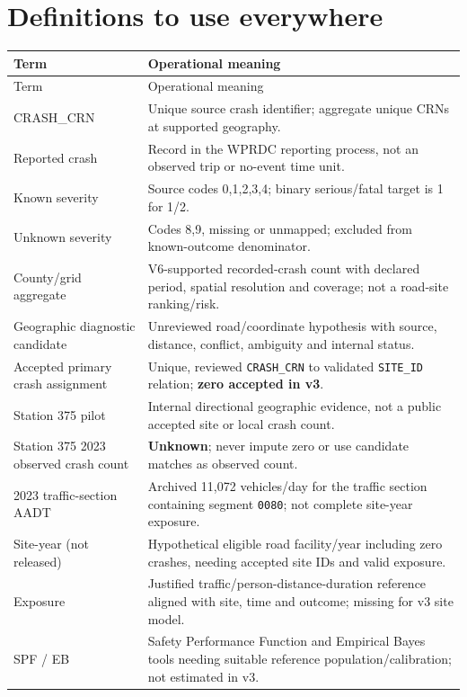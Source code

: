 \documentclass[11pt,a4paper,openany]{report}
\newcommand{\pathcode}[1]{\nolinkurl{#1}}
\begin{document}
\section{Definitions to use everywhere}
\small
\begin{longtable}{@{}L{43mm}L{99mm}@{}}\toprule Term & Operational meaning\\\midrule\endfirsthead
\toprule Term & Operational meaning\\\midrule\endhead
CRASH\_CRN & Unique source crash identifier; aggregate unique CRNs at supported geography.\\
Reported crash & Record in the WPRDC reporting process, not an observed trip or no-event time unit.\\
Known severity & Source codes 0,1,2,3,4; binary serious/fatal target is 1 for 1/2.\\
Unknown severity & Codes 8,9, missing or unmapped; excluded from known-outcome denominator.\\
County/grid aggregate & V6-supported recorded-crash count with declared period, spatial resolution and coverage; not a road-site ranking/risk.\\
Geographic diagnostic candidate & Unreviewed road/coordinate hypothesis with source, distance, conflict, ambiguity and internal status.\\
Accepted primary crash assignment & Unique, reviewed \pathcode{CRASH_CRN} to validated \pathcode{SITE_ID} relation; \textbf{zero accepted in v3}.\\
Station 375 pilot & Internal directional geographic evidence, not a public accepted site or local crash count.\\
Station 375 2023 observed crash count & \textbf{Unknown}; never impute zero or use candidate matches as observed count.\\
2023 traffic-section AADT & Archived 11,072 vehicles/day for the traffic section containing segment \pathcode{0080}; not complete site-year exposure.\\
Site-year (not released) & Hypothetical eligible road facility/year including zero crashes, needing accepted site IDs and valid exposure.\\
Exposure & Justified traffic/person-distance-duration reference aligned with site, time and outcome; missing for v3 site model.\\
SPF / EB & Safety Performance Function and Empirical Bayes tools needing suitable reference population/calibration; not estimated in v3.\\

\end{longtable}
\end{document}
